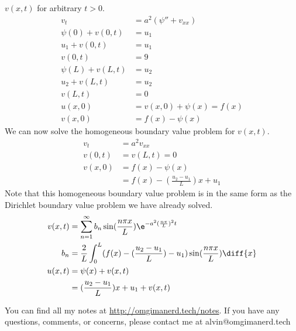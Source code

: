 \documentclass{math}
\begin{document}
\( v(x,t) \) for arbitrary \( t>0 \).
\begin{align*}
  v_t &= a^2(\psi''+v_{xx}) \\
  \psi(0)+v(0,t) &= u_1 \\
  u_1+v(0,t) &= u_1 \\
  v(0,t) &= 9 \\
  \psi(L)+v(L,t) &= u_2 \\
  u_2+v(L,t) &= u_2 \\
  v(L,t) &= 0 \\
  u(x,0) &= v(x,0)+\psi(x) = f(x) \\
  v(x,0) &= f(x)-\psi(x)
\end{align*}
We can now solve the homogeneous boundary value problem for \( v(x,t) \).
\begin{align*}
  v_t &= a^2v_{xx} \\
  v(0,t) &= v(L,t) = 0 \\
  v(x,0) &= f(x)-\psi(x) \\
  &= f(x)-(\frac{u_2-u_1}{L})x+u_1
\end{align*}
Note that this homogeneous boundary value problem is in the same form as the
Dirichlet boundary value problem we have already solved.
\begin{align*}
  v(x,t) &= \sum_{n=1}^{\infty}
    b_n\sin(\frac{n\pi x}{L})\e^{-a^2(\frac{n\pi}{L})^2t} \\
  b_n &= \frac{2}{L}
    \int_{0}^{L}(f(x)-(\frac{u_2-u_1}{L})-u_1)\sin(\frac{n\pi x}{L})\diff{x} \\
  u(x,t) &= \psi(x)+v(x,t) \\
  &= (\frac{u_2-u_1}{L})x+u_1+v(x,t)
\end{align*}

\begin{center}
  You can find all my notes at \url{http://omgimanerd.tech/notes}. If you have
  any questions, comments, or concerns, please contact me at
  alvin@omgimanerd.tech
\end{center}
\end{document}

